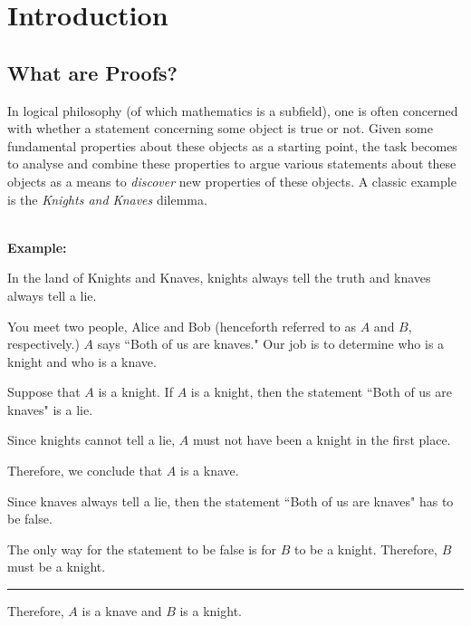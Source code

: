 \newcommand{\hrulesmall}{\rule{0.8\textwidth}{1pt}}
\newenvironment{expl}{
\noindent\hrulefill \\
    \textbf{Example:}
}
{

\noindent\hrulefill \\
}


\chapter{Introduction}
\section{What are Proofs?}
In logical philosophy (of which mathematics is a subfield), one is often concerned
with whether a statement concerning some object is true or not. Given some fundamental
properties about these objects as a starting point, the task becomes to analyse
and combine these properties to argue various statements about these objects as
a means to \emph{discover} new properties of these objects. A classic example is the
\textit{Knights and Knaves} dilemma.

\begin{expl}
In the land of Knights and Knaves, knights always tell the truth and
  knaves always tell a lie.

You meet two people, Alice and Bob (henceforth referred to as $A$ and $B$, respectively.)
$A$ says ``Both of us are knaves." Our job is to determine who is a knight and who is a knave.

\begin{list}{}{}
  \item Suppose that $A$ is a knight. If $A$ is a knight, then the statement ``Both of us are knaves" is a lie.
  \item Since knights cannot tell a lie, $A$ must not have been a knight in the first place.
  \item Therefore, we conclude that $A$ is a knave.

  \item Since knaves always tell a lie, then the statement ``Both of us are knaves" has to be false.
  \item The only way for the statement to be false is for $B$ to be a knight. Therefore, $B$ must be a knight.
  \item \hrulesmall
  \item Therefore, $A$ is a knave and $B$ is a knight.
\end{list}
\end{expl}

